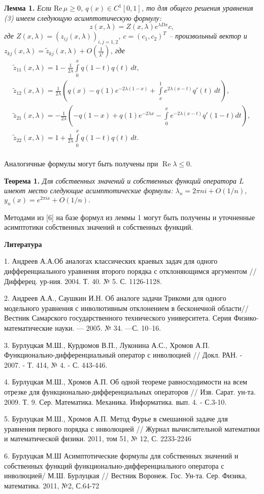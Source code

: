 \textbf{Лемма 1.} {\it Если $\mathrm{Re\,} \mu \ge 0$,  $q (x)\in
C^1[0,1]$, то для общего решения уравнения (3) имеем следующую
асимптотическую формулу:
$$ z(x, \lambda )=Z(x,  \lambda) e^{\lambda  {D}x}c, $$
где $ Z(x,  \lambda)= (z_{ij}(x,  \lambda))_{i,j=1,2}$,  $c=(c_1,
c_2)^T$ -- произвольный вектор и $z_{kj}(x,
\lambda)=\widetilde{z}_{kj}(x,\lambda)+ O\left( \frac1{ \lambda^2}
\right)$, где
$$\begin{array}{l} \widetilde{z}_{11}(x, \lambda)=1 -\frac1{2 \lambda}\int\limits_0^x q(1-t) q(t)\, dt, \\
\widetilde{z}_{12}(x, \lambda)=\frac1{2 \lambda}\left(q(x)- q(1)
e^{-2\lambda (1- x)}+ \int\limits_x^1 e^{2\lambda (x- t)} q'(t)\,
dt\right)\!,\\
 \widetilde{z}_{21}(x, \lambda)= {-}\frac1{2 \lambda}\!\left({-}q(1{-}x){+}q(1)
e^{-2\lambda  x}{-}\int\limits_0^x e^{-2\lambda (x{-}t)} q'(1{-}t)  dt\right)\!\!,\\
%
\widetilde{z}_{22}(x, \lambda)=1 +\frac1{2 \lambda}\int\limits_0^x
q(1-t) q(t)\, dt. \end{array}$$} \\
Аналогичные
формулы могут быть получены при $\operatorname{Re}\lambda \le 0$.

\textbf{Теорема 1.} {\it Для собственных значений и собственных
функций оператора $L$ имеют место следующие асимптотические формулы:
${{\lambda }_{n}}=2\pi ni+O(1/n),$ ${{y}_{n}}\left( x
\right)={{e}^{2\pi ix}}+O(1/n).$}

Методами из [6] на базе формул из леммы 1  могут быть получены и
уточненные асимптотики собственных значений и собственных функций.

\smallskip \centerline{\bf Литература}\nopagebreak

1. Андреев А.А.Об аналогах классических краевых задач для одного
дифференциального уравнения второго порядка с отклоняющимся
аргументом // Дифферец. ур-ния. 2004. Т. 40. № 5. С. 1126-1128.

2. Андреев  А.А., Саушкин И.Н. Об аналоге задачи Трикоми для одного
модельного уравнения с инволютивным отклонением в бесконечной
области// Вестник Самарского государственного технического
университета. Серия Физико-математические науки. --- 2005. № 34.
---С. 10--16.

3. Бурлуцкая М.Ш., Курдюмов В.П.,  Луконина А.С.,  Хромов А.П.
Функционально-дифференциальный оператор с инволюцией  // Докл. РАН.
- 2007. - Т. 414, № 4. - С. 443-446.

4. Бурлуцкая М.Ш., Хромов А.П.  Об одной теореме равносходимости  на
всем отрезке для функционально-диффе\-рен\-циаль\-ных операторов //
Изв. Сарат. ун-та. 2009. Т. 9. Сер. Математика. Механика.
Информатика. вып. 4. - С.3-10.

5. Бурлуцкая М.Ш., Хромов А.П. Метод Фурье в  смешанной задаче для
уравнения первого порядка   с инволюцией // Журнал вычислительной
математики и математической физики. 2011, том 51, № 12, С. 2233-2246

6. Бурлуцкая М.Ш Асимптотические формулы для собственных значений и
собственных функций функционально-дифференциального оператора с
инволюцией/ М.Ш. Бурлуцкая // Вестник Воронеж. Гос. Ун-та. Сер.
Физика, математика. 2011, №2, С.64-72
